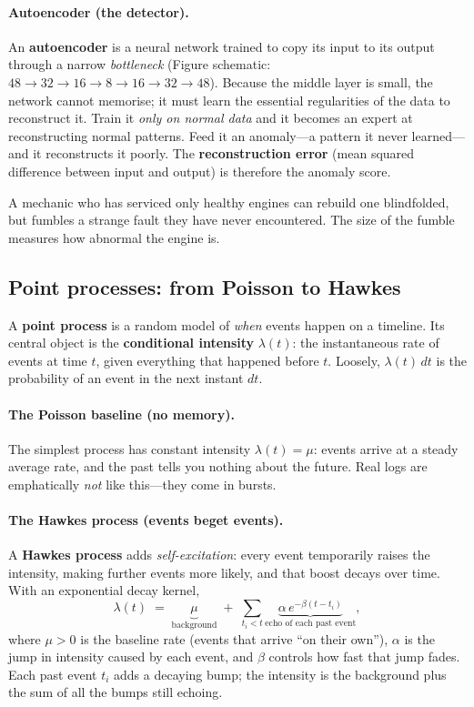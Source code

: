 \documentclass[11pt,a4paper]{article}
\newcommand{\keyword}[1]{\textbf{\color{accent}#1}}
\begin{document}
\paragraph{Autoencoder (the detector).} An \keyword{autoencoder} is a neural
network trained to copy its input to its output through a narrow \emph{bottleneck}
(Figure schematic: $48\!\to\!32\!\to\!16\!\to\!8\!\to\!16\!\to\!32\!\to\!48$).
Because the middle layer is small, the network cannot memorise; it must learn the
essential regularities of the data to reconstruct it. Train it \emph{only on
normal data} and it becomes an expert at reconstructing normal patterns. Feed it
an anomaly---a pattern it never learned---and it reconstructs it poorly. The
\keyword{reconstruction error} (mean squared difference between input and output)
is therefore the anomaly score.

\begin{intuition}
A mechanic who has serviced only healthy engines can rebuild one blindfolded, but
fumbles a strange fault they have never encountered. The size of the fumble
measures how abnormal the engine is.
\end{intuition}

\subsection{Point processes: from Poisson to Hawkes}
\label{sec:primer-hawkes}
A \keyword{point process} is a random model of \emph{when} events happen on a
timeline. Its central object is the \keyword{conditional intensity} $\lambda(t)$:
the instantaneous rate of events at time $t$, given everything that happened
before $t$. Loosely, $\lambda(t)\,dt$ is the probability of an event in the next
instant $dt$.

\paragraph{The Poisson baseline (no memory).} The simplest process has constant
intensity $\lambda(t)=\mu$: events arrive at a steady average rate, and the past
tells you nothing about the future. Real logs are emphatically \emph{not} like
this---they come in bursts.

\paragraph{The Hawkes process (events beget events).} A \keyword{Hawkes process}
adds \emph{self-excitation}: every event temporarily raises the intensity, making
further events more likely, and that boost decays over time. With an exponential
decay kernel,
\begin{equation}
\lambda(t) \;=\; \underbrace{\mu}_{\text{background}}
\;+\; \sum_{t_i < t}\underbrace{\alpha\,e^{-\beta(t-t_i)}}_{\text{echo of each past event}},
\label{eq:hawkes-primer}
\end{equation}
where $\mu>0$ is the baseline rate (events that arrive ``on their own''), $\alpha$
is the jump in intensity caused by each event, and $\beta$ controls how fast that
jump fades. Each past event $t_i$ adds a decaying bump; the intensity is the
background plus the sum of all the bumps still echoing.
\end{document}
